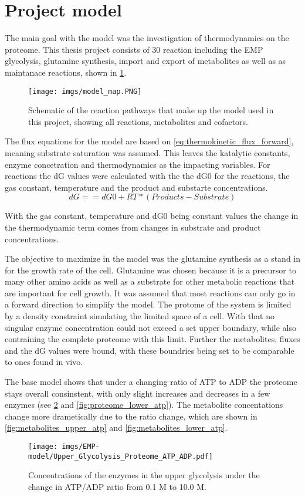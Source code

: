 \section{Project model}
The main goal with the model was the investigation of thermodynamics on the proteome. 
This thesis project consists of 30 reaction including the EMP glycolysis, glutamine synthesis, import and export of metabolites as well as as maintanace reactions, shown in \ref{fig:model_map}. 
\begin{figure}[H]
    \centering
    \texttt{[image: imgs/model\_map.PNG]}
    \caption{Schematic of the reaction pathways that make up the model used in this project, showing all reactions, metabolites and cofactors.}
    \label{fig:model_map}
\end{figure}

The flux equations for the model are based on \ref{eq:thermokinetic_flux_forward}, meaning substrate saturation was assumed. This leaves the katalytic constants, enzyme concetration and thermodynamics as the impacting variables.
For reactions the dG values were calculated with the the dG0 for the reactions, the gas constant, temperature and the product and substarte concentrations.
\begin{equation}
    dG == dG0 + RT * (Products - Substrate)
    \label{eq:general_dG}
\end{equation}

With the gas constant, temperature and dG0 being constant values the change in the thermodynamic term comes from changes in substrate and product concentrations. 

The objective to maximize in the model was the glutamine synthesis as a stand in for the growth rate of the cell. Glutamine was chosen because it is a precursor to many other amino acids as well as a substrate for other metabolic reactions that are important for cell growth.
It was assumed that most reactions can only go in a forward direction to simplify the model. 
The protome of the system is limited by a density constraint simulating the limited space of a cell. With that no singular enzyme concentration could not exceed a set upper boundary, while also contraining the complete proteome with this limit.
Further the metabolites, fluxes and the dG values were bound, with these boundries being set to be  comparable to ones found in vivo. 

The base model shows that under a changing ratio of ATP to ADP the proteome stays overall consinstent, with only slight increases and decreases in a few enzymes (see \ref{fig:proteome_upper_atp} and \ref{fig:proteome_lower_atp}). The metabolite concentations change more drametically due to the ratio change, which are shown in \ref{fig:metabolites_upper_atp} and \ref{fig:metabolites_lower_atp}. 
\begin{figure}[H]
    \centering
    \texttt{[image: imgs/EMP-model/Upper\_Glycolysis\_Proteome\_ATP\_ADP.pdf]}
    \caption{Concentrations of the enzymes in the upper glycolysis under the change in ATP/ADP ratio from 0.1 M to 10.0 M.}
    \label{fig:proteome_upper_atp}
\end{figure}

